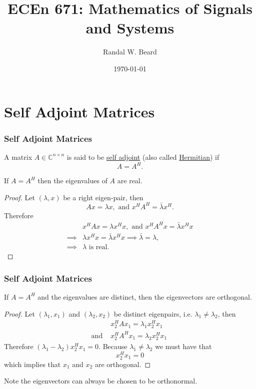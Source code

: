 \documentclass{beamer}
\title{ECEn 671: Mathematics of Signals and Systems}
\author{Randal W. Beard}
\institute{Brigham Young University}
\date{\today}
\begin{document}
\begin{frame}
	\titlepage
\end{frame}




\section{Self Adjoint Matrices}
\frame{\sectionpage}

\begin{frame}\frametitle{Self Adjoint Matrices}
	\begin{definition}
	A matrix $A\in\mathbb{C}^{n\times n}$ is said to be \underline{self adjoint} (also called \underline{Hermitian}) if 
	\[
		A = A^H.
	\]	
	\end{definition}
	
	\begin{lemma}[Moon 6.2]
 		If $A = A^H$ then the eigenvalues of $A$ are real.
	\end{lemma}
	\begin{proof}
		Let $(\lambda,x)$ be a right eigen-pair, then
		\[ 
			Ax = \lambda x, \text{ and } x^HA^H = \bar{\lambda}x^H.
		\]
		Therefore 
		\begin{align*}
			& x^HAx = \lambda x^Hx, \text{ and } x^HA^Hx = \bar{\lambda}x^Hx \\
			\implies & \lambda x^Hx = \bar{\lambda}x^Hx  
			\implies  \bar{\lambda} = \lambda, \\
			\implies & \lambda \text{ is real. }	
		\end{align*}
	\end{proof}
\end{frame}

\begin{frame}\frametitle{Self Adjoint Matrices}
	\begin{lemma}[Moon 6.3]
		If $A=A^H$ and the eigenvalues are distinct, then the eigenvectors are orthogonal.
	\end{lemma}
	
	\begin{proof}
	Let $(\lambda_1,x_1)$ and $(\lambda_2,x_2)$ be distinct eigenpairs, i.e. $\lambda_1 \neq \lambda_2$, then
	\begin{align*}
		& x_2^HAx_1 = \lambda_1x_2^Hx_1 \\
		\text{and~} & x_2^HA^Hx_1 = \lambda_2x_2^Hx_1 \
	\end{align*}
	Therefore $(\lambda_1-\lambda_2)x_2^Hx_1 = 0$.
	Because $\lambda_1 \neq \lambda_2$ we must have that
	\[
		x_2^Hx_1 = 0
	\]
	which implies that $x_1$ and $x_2$ are orthogonal.
	\end{proof}
	{\color{blue}
		Note the eigenvectors can always be chosen to be orthonormal.
	}
\end{frame}
\end{document}
